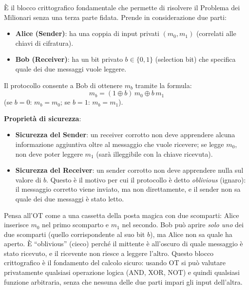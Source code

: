 \documentclass[a4paper,11pt]{article}
\begin{document}
\begin{definizione}
\`{E} il blocco crittografico fondamentale che permette di risolvere il Problema dei Milionari senza una terza parte fidata. Prende in considerazione due parti:
\begin{itemize}
  \item \textbf{Alice (Sender)}: ha una coppia di input privati $(m_0, m_1)$ (correlati alle chiavi di cifratura).
  \item \textbf{Bob (Receiver)}: ha un bit privato $b \in \{0,1\}$ (selection bit) che specifica quale dei due messaggi vuole leggere.
\end{itemize}
Il protocollo consente a Bob di ottenere $m_b$ tramite la formula:
\[
m_b = (1 \oplus b)\,m_0 \oplus b\,m_1
\]
(se $b=0$: $m_b = m_0$; se $b=1$: $m_b = m_1$).

\textbf{Proprietà di sicurezza}:
\begin{itemize}
  \item \textbf{Sicurezza del Sender}: un receiver corrotto non deve apprendere alcuna informazione aggiuntiva oltre al messaggio che vuole ricevere; se legge $m_0$, non deve poter leggere $m_1$ (sarà illeggibile con la chiave ricevuta).
  \item \textbf{Sicurezza del Receiver}: un sender corrotto non deve apprendere nulla sul valore di $b$. Questo è il motivo per cui il protocollo è detto \emph{oblivious} (ignaro): il messaggio corretto viene inviato, ma non direttamente, e il sender non sa quale dei due messaggi è stato letto.
\end{itemize}
\end{definizione}

\begin{nota}
Pensa all'OT come a una cassetta della posta magica con due scomparti: Alice inserisce $m_0$ nel primo scomparto e $m_1$ nel secondo. Bob può aprire \emph{solo uno} dei due scomparti (quello corrispondente al suo bit $b$), ma Alice non sa quale ha aperto. È ``oblivious'' (cieco) perché il mittente è all'oscuro di quale messaggio è stato ricevuto, e il ricevente non riesce a leggere l'altro. Questo blocco crittografico è il fondamento del calcolo sicuro: usando OT si può valutare privatamente qualsiasi operazione logica (AND, XOR, NOT) e quindi qualsiasi funzione arbitraria, senza che nessuna delle due parti impari gli input dell'altra.
\end{nota}
\end{document}

